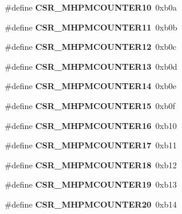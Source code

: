 \begin{DoxyCompactItemize}
\#define {\bfseries C\+S\+R\+\_\+\+M\+H\+P\+M\+C\+O\+U\+N\+T\+E\+R10}~0xb0a
\item 
\mbox{\label{riscv-utility_8h_aa6c748eba850b6d58630a718f9e01b82}} 
\#define {\bfseries C\+S\+R\+\_\+\+M\+H\+P\+M\+C\+O\+U\+N\+T\+E\+R11}~0xb0b
\item 
\mbox{\label{riscv-utility_8h_a76832c0780249855bcc916fe79e420b0}} 
\#define {\bfseries C\+S\+R\+\_\+\+M\+H\+P\+M\+C\+O\+U\+N\+T\+E\+R12}~0xb0c
\item 
\mbox{\label{riscv-utility_8h_ae389f784655a09fba7f6ec2899b70215}} 
\#define {\bfseries C\+S\+R\+\_\+\+M\+H\+P\+M\+C\+O\+U\+N\+T\+E\+R13}~0xb0d
\item 
\mbox{\label{riscv-utility_8h_a3e2db0c2ff1141b64d8a56c1a31b77da}} 
\#define {\bfseries C\+S\+R\+\_\+\+M\+H\+P\+M\+C\+O\+U\+N\+T\+E\+R14}~0xb0e
\item 
\mbox{\label{riscv-utility_8h_adfd273016afeb9771172c9cbeb9887cb}} 
\#define {\bfseries C\+S\+R\+\_\+\+M\+H\+P\+M\+C\+O\+U\+N\+T\+E\+R15}~0xb0f
\item 
\mbox{\label{riscv-utility_8h_a0b418296b63cdfe99dd9507cc778d14d}} 
\#define {\bfseries C\+S\+R\+\_\+\+M\+H\+P\+M\+C\+O\+U\+N\+T\+E\+R16}~0xb10
\item 
\mbox{\label{riscv-utility_8h_aa67f519b1e39b1868822afe663f497fb}} 
\#define {\bfseries C\+S\+R\+\_\+\+M\+H\+P\+M\+C\+O\+U\+N\+T\+E\+R17}~0xb11
\item 
\mbox{\label{riscv-utility_8h_acb72065967f51ecdd5a22122d572bb43}} 
\#define {\bfseries C\+S\+R\+\_\+\+M\+H\+P\+M\+C\+O\+U\+N\+T\+E\+R18}~0xb12
\item 
\mbox{\label{riscv-utility_8h_afd2f303ac1c97e4b17b4bdb6dae67a9d}} 
\#define {\bfseries C\+S\+R\+\_\+\+M\+H\+P\+M\+C\+O\+U\+N\+T\+E\+R19}~0xb13
\item 
\mbox{\label{riscv-utility_8h_a161acddb79ddb855b1656fe1df53a2c5}} 
\#define {\bfseries C\+S\+R\+\_\+\+M\+H\+P\+M\+C\+O\+U\+N\+T\+E\+R20}~0xb14

\end{DoxyCompactItemize}
